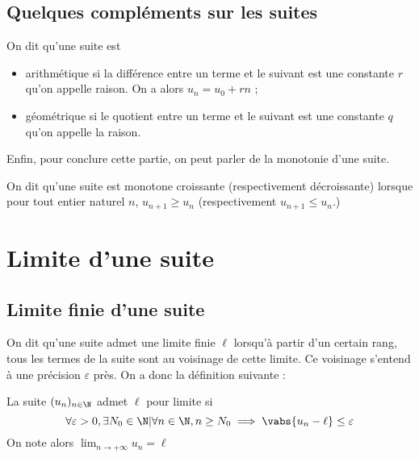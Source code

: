 \documentclass[12pt,a4paper,frenchb]{article}
\begin{document}
\subsection{Quelques compléments sur les suites}

\begin{definition}
  On dit qu'une suite est
  \begin{itemize}
    \item arithmétique si la différence entre un terme et le suivant est
      une constante $r$ qu'on appelle raison. On a alors $u_n = u_0 +
      rn$ ;
    \item géométrique si le quotient entre un terme et le suivant est
      une constante $q$ qu'on appelle la raison.
  \end{itemize}
\end{definition}



Enfin, pour conclure cette partie, on peut parler de la monotonie d'une
suite.

\begin{definition}
  On dit qu'une suite est monotone croissante (respectivement
  décroissante) lorsque pour tout entier naturel $n$, $u_{n+1} \geq u_n$
  (respectivement $u_{n+1} \leq u_n$.)
\end{definition}

\section{Limite d'une suite}

\subsection{Limite finie d'une suite}

On dit qu'une suite admet une limite finie $\ell$ lorsqu'à partir d'un
certain rang, tous les termes de la suite sont au voisinage de cette
limite. Ce voisinage s'entend à une précision $\varepsilon$ près. On a
donc la définition suivante :
\begin{definition}\label{def:suite:superieur}
  La suite $(u_n)_{n\in\N}$ admet $\ell$ pour limite si \[ \forall
    \varepsilon > 0, \exists N_0\in\N | \forall n \in\N , n\geq N_0
  \implies \vabs{u_n - \ell} \leq \varepsilon \]
  On note alors $\lim_{n\to+\infty} u_n = \ell$
\end{definition}
\end{document}
